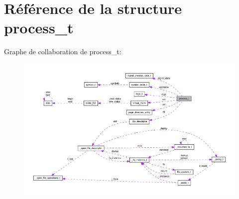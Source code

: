 \hypertarget{structprocess__t}{\section{Référence de la structure process\-\_\-t}
\label{structprocess__t}
}


Graphe de collaboration de process\-\_\-t\-:
\nopagebreak
\begin{figure}[H]
\begin{center}
\leavevmode
\includegraphics[width=350pt]{structprocess__t__coll__graph}
\end{center}
\end{figure}
